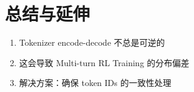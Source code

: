 \section{总结与延伸}
\begin{enumerate}
  \item Tokenizer encode-decode 不总是可逆的
  \item 这会导致 Multi-turn RL Training 的分布偏差
  \item 解决方案：确保 token IDs 的一致性处理
\end{enumerate}

